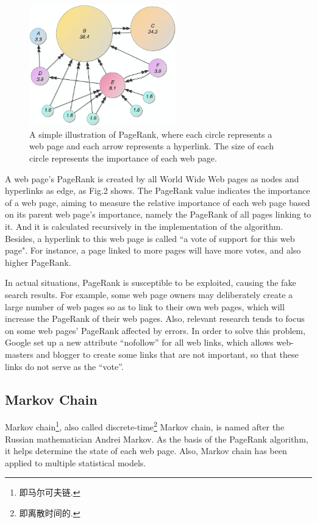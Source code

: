 \documentclass[lettersize,journal,12pt,conference]{IEEEtran}
\begin{document}
\begin{figure}[h]
    \centering
    \includegraphics[width=2.5in]{images/fig3.jpeg}
    \caption{A simple illustration of PageRank, where each circle represents a web page and each arrow represents a hyperlink. The size of each circle represents the importance of each web page.}
    \label{fig3}
\end{figure}

A web page's PageRank is created by all World Wide Web pages as nodes and hyperlinks as edge, as Fig.2 shows. The PageRank value indicates the importance of a web page, aiming to measure the relative importance of each web page based on its parent web page's importance, namely the PageRank of all pages linking to it. And it is calculated recursively in the implementation of the algorithm. Besides, a hyperlink to this web page is called ``a vote of support for this web page". For instance, a page linked to more pages will have more votes, and also higher PageRank. 

In actual situations, PageRank is susceptible to be exploited, causing the fake search results. For example, some web page owners may deliberately create a large number of web pages so as to link to their own web pages, which will increase the PageRank of their web pages. Also, relevant research tends to focus on some web pages' PageRank affected by errors. In order to solve this problem, Google set up a new attribute ``nofollow'' for all web links, which allows web-masters and blogger to create some links that are not important, so that these links do not serve as the ``vote''.

\subsection{Markov Chain}

Markov chain\footnote[1]{即马尔可夫链.}, also called discrete-time\footnote[2]{即离散时间的.} Markov chain, is named after the Russian mathematician Andrei Markov. As the basis of the PageRank algorithm, it helps determine the state of each web page. Also, Markov chain has been applied to multiple statistical models.
\end{document}
